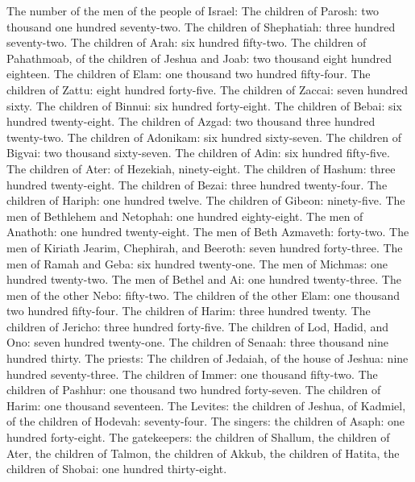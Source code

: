 The number of the men of the people of Israel:  The
children of Parosh: two thousand one hundred seventy-two. 
The children of Shephatiah: three hundred seventy-two. 
The children of Arah: six hundred fifty-two.  The
children of Pahathmoab, of the children of Jeshua and Joab: two thousand
eight hundred eighteen.  The children of Elam: one
thousand two hundred fifty-four.  The children of Zattu:
eight hundred forty-five.  The children of Zaccai: seven
hundred sixty.  The children of Binnui: six hundred
forty-eight.  The children of Bebai: six hundred
twenty-eight.  The children of Azgad: two thousand three
hundred twenty-two.  The children of Adonikam: six
hundred sixty-seven.  The children of Bigvai: two
thousand sixty-seven.  The children of Adin: six hundred
fifty-five.  The children of Ater: of Hezekiah,
ninety-eight.  The children of Hashum: three hundred
twenty-eight.  The children of Bezai: three hundred
twenty-four.  The children of Hariph: one hundred twelve.
 The children of Gibeon: ninety-five.  The
men of Bethlehem and Netophah: one hundred eighty-eight. 
The men of Anathoth: one hundred twenty-eight.  The men
of Beth Azmaveth: forty-two.  The men of Kiriath Jearim,
Chephirah, and Beeroth: seven hundred forty-three.  The
men of Ramah and Geba: six hundred twenty-one.  The men
of Michmas: one hundred twenty-two.  The men of Bethel
and Ai: one hundred twenty-three.  The men of the other
Nebo: fifty-two.  The children of the other Elam: one
thousand two hundred fifty-four.  The children of Harim:
three hundred twenty.  The children of Jericho: three
hundred forty-five.  The children of Lod, Hadid, and Ono:
seven hundred twenty-one.  The children of Senaah: three
thousand nine hundred thirty.  The priests: The children
of Jedaiah, of the house of Jeshua: nine hundred seventy-three.
 The children of Immer: one thousand fifty-two.
 The children of Pashhur: one thousand two hundred
forty-seven.  The children of Harim: one thousand
seventeen.  The Levites: the children of Jeshua, of
Kadmiel, of the children of Hodevah: seventy-four.  The
singers: the children of Asaph: one hundred forty-eight. 
The gatekeepers: the children of Shallum, the children of Ater, the
children of Talmon, the children of Akkub, the children of Hatita, the
children of Shobai: one hundred thirty-eight.

